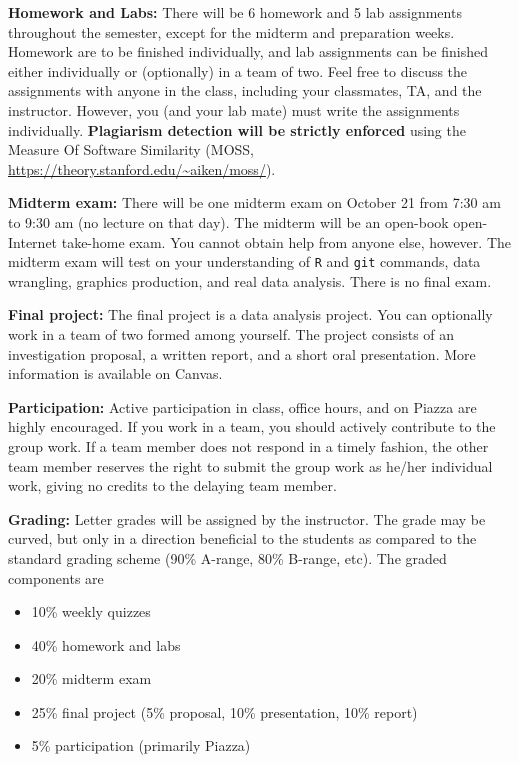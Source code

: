 \documentclass[10pt]{article}
\newcommand{\sep}{\vspace*{0.4cm}}
\begin{document}
\textbf{Homework and Labs:}
There will be 6 homework and 5 lab assignments throughout the semester, except for the midterm and preparation weeks.
Homework are to be finished individually, and lab assignments can be finished either individually or (optionally) in a team of two.
Feel free to discuss the assignments with anyone in the class, including your classmates, TA, and the instructor.
However, you (and your lab mate) must write the assignments individually. 
\textbf{Plagiarism detection will be strictly enforced} using the Measure Of Software Similarity (MOSS, \url{https://theory.stanford.edu/~aiken/moss/}).
\sep


\textbf{Midterm exam:}
There will be one midterm exam on October 21 from 7:30 am to 9:30 am (no lecture on that day).
The midterm will be an open-book open-Internet take-home exam. You cannot obtain help from anyone else, however. 
The midterm exam will test on your understanding of \texttt{R} and \texttt{git} commands, data wrangling, graphics production, and real data analysis. 
There is no final exam.
\sep

\textbf{Final project:}
The final project is a data analysis project. 
You can optionally work in a team of two formed among yourself.
The project consists of an investigation proposal, a written report, and a short oral presentation. 
More information is available on Canvas.
\sep

\textbf{Participation:}
Active participation in class, office hours, and on Piazza are highly encouraged. 
If you work in a team, you should actively contribute to the group work. 
If a team member does not respond in a timely fashion, the other team member reserves the right to submit the group work as he/her individual work, giving no credits to the delaying team member.

\sep

\textbf{Grading:} Letter grades will be assigned by the instructor. 
The grade may be curved, but only in a direction beneficial to the students as compared to the standard grading scheme (90\% A-range, 80\% B-range, etc). 
The graded components are
\begin{itemize}
\setlength\itemsep{0pt}
\item 10\% weekly quizzes %
\item 40\% homework and labs
\item 20\% midterm exam 
\item 25\% final project (5\% proposal, 10\% presentation, 10\% report)
\item 5\% participation (primarily Piazza)
\end{itemize}
\sep
\end{document}
